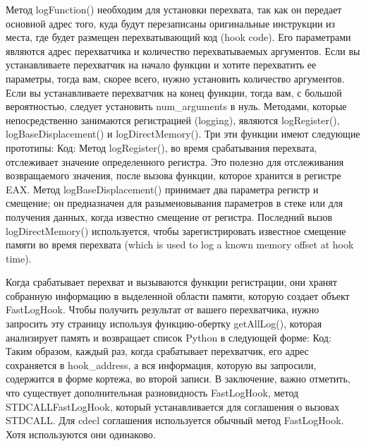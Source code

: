 \documentclass[12pt, a4paper, oneside]{book}
\begin{document}
Метод logFunction() необходим для установки перехвата, так как он передает основной адрес того, куда будут перезаписаны оригинальные инструкции из места, где будет размещен перехватывающий код (hook code). Его параметрами являются адрес перехватчика и количество перехватываемых аргументов. Если вы устанавливаете перехватчик на начало функции и хотите перехватить ее параметры, тогда вам, скорее всего, нужно установить количество аргументов. Если вы устанавливаете перехватчик на конец функции, тогда вам, с большой вероятностью, следует установить num\_arguments в нуль. Методами, которые непосредственно занимаются регистрацией (logging), являются logRegister(), logBaseDisplacement() и logDirectMemory(). Три эти функции имеют следующие прототипы:
Код:
Метод logRegister(), во время срабатывания перехвата, отслеживает значение определенного регистра. Это полезно для отслеживания возвращаемого значения, после вызова функции, которое хранится в регистре EAX. Метод logBaseDisplacement() принимает два параметра регистр и смещение; он предназначен для разыменовывания параметров в стеке или для получения данных, когда известно смещение от регистра. Последний вызов logDirectMemory() используется, чтобы зарегистрировать известное смещение памяти во время перехвата (which is used to log a known memory offset at hook time).

Когда срабатывает перехват и вызываются функции регистрации, они хранят собранную информацию в выделенной области памяти, которую создает объект FastLogHook. Чтобы получить результат от вашего перехватчика, нужно запросить эту страницу используя функцию-обертку getAllLog(), которая анализирует память и возвращает список Python в следующей форме:
Код:
Таким образом, каждый раз, когда срабатывает перехватчик, его адрес сохраняется в hook\_address, а вся информация, которую вы запросили, содержится в форме кортежа, во второй записи. В заключение, важно отметить, что существует дополнительная разновидность FastLogHook, метод STDCALLFastLogHook, который устанавливается для соглашения о вызовах STDCALL. Для cdecl соглашения используется обычный метод FastLogHook. Хотя используются они одинаково.
\end{document}
